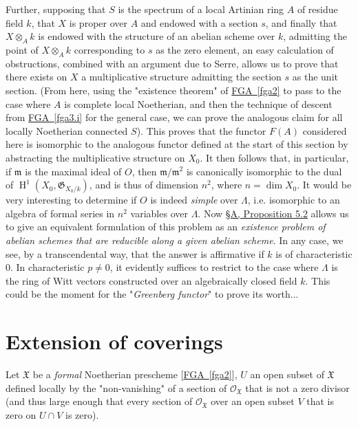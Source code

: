   Further, supposing that \(S\) is the spectrum of a local Artinian ring \(A\) of residue field \(k\), that \(X\) is proper over \(A\) and endowed with a section \(s\), and finally that \(X\otimes _A k\) is endowed with the structure of an abelian scheme over \(k\), admitting the point of \(X\otimes _A k\) corresponding to \(s\) as the zero element, an easy calculation of obstructions, combined with an argument due to Serre, allows us to prove that there exists on \(X\) a multiplicative structure admitting the section \(s\) as the unit section.
  (From here, using the "existence theorem" of \hyperref[fga2]{FGA~\ref*{fga2}} to pass to the case where \(A\) is complete local Noetherian, and then the technique of descent from \hyperref[fga3.i]{FGA~\ref*{fga3.i}} for the general case, we can prove the analogous claim for all locally Noetherian connected \(S\)).
  This proves that the functor \(F(A)\) considered here is isomorphic to the analogous functor defined at the start of this section by abstracting the multiplicative structure on \(X_0\).
  It then follows that, in particular, if \(\mathfrak {m}\) is the maximal ideal of \(O\), then \(\mathfrak {m}/\mathfrak {m}^2\) is canonically isomorphic to the dual of \(\operatorname {H}^1(X_0,\mathfrak {G}_{X_0/k})\), and is thus of dimension \(n^2\), where \(n=\dim  X_0\).
  It would be very interesting to determine if \(O\) is indeed \emph{simple} over \(\Lambda \), i.e. isomorphic to an algebra of formal series in \(n^2\) variables over \(\Lambda \).
  Now \hyperref[fga3.ii-a.5-proposition-5.2]{§A, Proposition 5.2} allows us to give an equivalent formulation of this problem as an \emph{existence problem of abelian schemes that are reducible along a given abelian scheme}.
  In any case, we see, by a transcendental way, that the answer is affirmative if \(k\) is of characteristic \(0\).
  In characteristic \(p\neq 0\), it evidently suffices to restrict to the case where \(\Lambda \) is the ring of Witt vectors constructed over an algebraically closed field \(k\).
  This could be the moment for the "\emph{Greenberg functor}" to prove its worth...\section{Extension of coverings}\label{fga3.ii-c.5}\par{}Let \(\mathfrak {X}\) be a \emph{formal} Noetherian prescheme [\hyperref[fga2]{FGA~\ref*{fga2}}], \(U\) an open subset of \(\mathfrak {X}\) defined locally by the "non-vanishing" of a section of \(\mathscr {O}_\mathfrak {X}\) that is not a zero divisor (and thus large enough that every section of \(\mathscr {O}_\mathfrak {X}\) over an open subset \(V\) that is zero on \(U\cap  V\) is zero).
